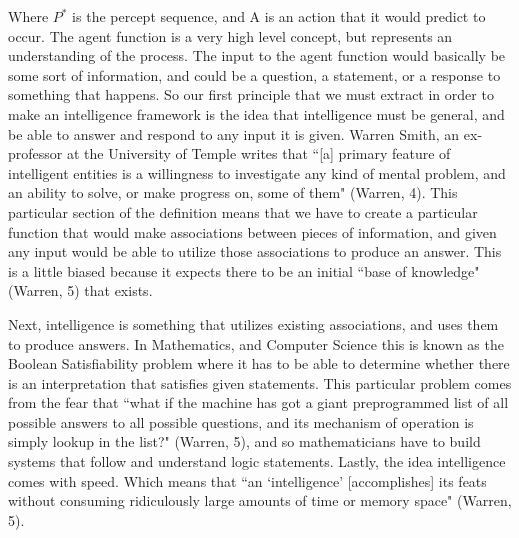 \documentclass[11pt, oneside]{article}
\begin{document}
\noindent Where $P^*$ is the percept sequence, and A is an action that it would predict to occur. The agent function is a very high level concept, but represents an understanding of the process. The input to the agent function would basically be some sort of information, and could be a question, a statement, or a response to something that happens. So our first principle that we must extract in order to make an intelligence framework is the idea that intelligence must be general, and be able to answer and respond to any input it is given. Warren Smith, an ex-professor at the University of Temple writes that ``[a] primary feature of intelligent entities is a willingness to investigate any kind of mental problem, and an ability to solve, or make progress on, some of them" (Warren, 4). This particular section of the definition means that we have to create a particular function that would make associations between pieces of information, and given any input would be able to utilize those associations to produce an answer. This is a little biased because it expects there to be an initial ``base of knowledge" (Warren, 5) that exists. 

\par Next, intelligence is something that utilizes existing associations, and uses them to produce answers. In Mathematics, and Computer Science this is known as the Boolean Satisfiability problem where it has to be able to determine whether there is an interpretation that satisfies given statements. This particular problem comes from the fear that ``what if the machine has got a giant preprogrammed list of all possible answers to all possible questions, and its mechanism of operation is simply lookup in the list?" (Warren, 5), and so mathematicians have to build systems that follow and understand logic statements. Lastly, the idea intelligence comes with speed. Which means that ``an `intelligence' [accomplishes] its feats without consuming ridiculously large amounts of time or memory space" (Warren, 5). 
\end{document}
